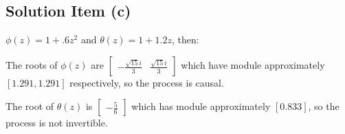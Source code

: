 \subsection*{Solution Item (c)}

$\phi(z) = 1+.6z^2$ and $\theta(z) = 1+1.2 z$, then:

The roots of $\phi(z)$ are $\left[\begin{matrix}- \frac{\sqrt{15} i}{3} & \frac{\sqrt{15} i}{3}\end{matrix}\right]
$ which have module approximately $[1.291, 1.291]
$ respectively, so the process is causal.

The root of $\theta(z)$ is $\left[\begin{matrix}- \frac{5}{6}\end{matrix}\right]$ which has module approximately $[0.833]$, so the process is not invertible.